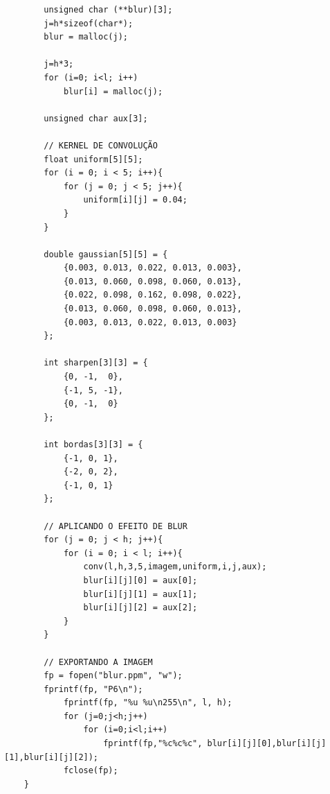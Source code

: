 \documentclass[a4paper, 11pt]{article}
\begin{document}
\begin{verbatim}
        unsigned char (**blur)[3];
        j=h*sizeof(char*);
        blur = malloc(j);

        j=h*3;
        for (i=0; i<l; i++)
            blur[i] = malloc(j);

        unsigned char aux[3];

        // KERNEL DE CONVOLUÇÃO
        float uniform[5][5];
        for (i = 0; i < 5; i++){
            for (j = 0; j < 5; j++){
                uniform[i][j] = 0.04;
            }
        }

        double gaussian[5][5] = {
            {0.003, 0.013, 0.022, 0.013, 0.003},
            {0.013, 0.060, 0.098, 0.060, 0.013},
            {0.022, 0.098, 0.162, 0.098, 0.022},
            {0.013, 0.060, 0.098, 0.060, 0.013},
            {0.003, 0.013, 0.022, 0.013, 0.003}
        };

        int sharpen[3][3] = {
            {0, -1,  0},
            {-1, 5, -1},
            {0, -1,  0}
        };

        int bordas[3][3] = {
            {-1, 0, 1},
            {-2, 0, 2},
            {-1, 0, 1}
        };
        
        // APLICANDO O EFEITO DE BLUR
        for (j = 0; j < h; j++){
            for (i = 0; i < l; i++){
                conv(l,h,3,5,imagem,uniform,i,j,aux);
                blur[i][j][0] = aux[0];
                blur[i][j][1] = aux[1];
                blur[i][j][2] = aux[2];
            }
        }
        
        // EXPORTANDO A IMAGEM
        fp = fopen("blur.ppm", "w");
        fprintf(fp, "P6\n");
            fprintf(fp, "%u %u\n255\n", l, h);
            for (j=0;j<h;j++)
                for (i=0;i<l;i++)
                    fprintf(fp,"%c%c%c", blur[i][j][0],blur[i][j][1],blur[i][j][2]);
            fclose(fp);
    }
\end{verbatim} 
\end{document}
